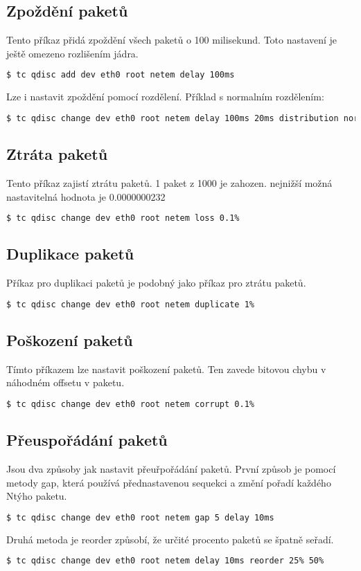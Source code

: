 \subsection*{Zpoždění paketů}
Tento příkaz přidá zpoždění všech paketů o 100 milisekund. Toto nastavení je ještě omezeno rozlišením jádra.
\begin{lstlisting}[language=bash]
    $ tc qdisc add dev eth0 root netem delay 100ms
\end{lstlisting}

Lze i nastavit zpoždění pomocí rozdělení. Příklad s normalním rozdělením:
\begin{lstlisting}[language=bash]
    $ tc qdisc change dev eth0 root netem delay 100ms 20ms distribution normal
\end{lstlisting}

\subsection*{Ztráta paketů}
Tento příkaz zajistí ztrátu paketů. 1 paket z 1000 je zahozen. nejnižší možná nastavitelná hodnota je 0.0000000232%
\begin{lstlisting}[language=bash]
    $ tc qdisc change dev eth0 root netem loss 0.1%
\end{lstlisting}

\subsection*{Duplikace paketů}
Příkaz pro duplikaci paketů je podobný jako příkaz pro ztrátu paketů.
\begin{lstlisting}[language=bash]
    $ tc qdisc change dev eth0 root netem duplicate 1%
\end{lstlisting}

\subsection*{Poškození paketů}
Tímto příkazem lze nastavit poškození paketů. Ten zavede bitovou chybu v náhodném offsetu v paketu. 
\begin{lstlisting}[language=bash]
    $ tc qdisc change dev eth0 root netem corrupt 0.1%
\end{lstlisting}

\subsection*{Přeuspořádání paketů}
Jsou dva způsoby jak nastavit přeuřpořádání paketů.
První způsob je pomocí metody gap, která používá přednastavenou sequekci a změní pořadí každého Ntýho paketu.
\begin{lstlisting}[language=bash]
    $ tc qdisc change dev eth0 root netem gap 5 delay 10ms
\end{lstlisting}
Druhá metoda je reorder způsobí, že určité procento paketů se špatně seřadí.
\begin{lstlisting}[language=bash]
    $ tc qdisc change dev eth0 root netem delay 10ms reorder 25% 50%
\end{lstlisting}

